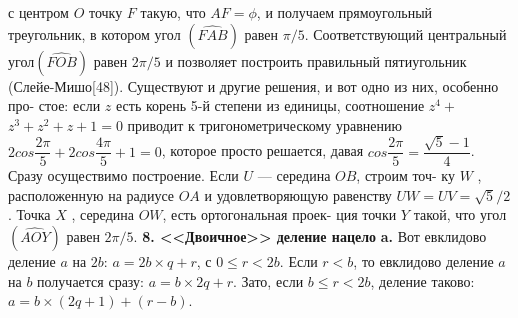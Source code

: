 с центром $O$ точку $F$ такую, что $AF=\phi$, и получаем прямоугольный
треугольник, в котором угол $(\widehat{FAB})$ равен $\pi/5$.\newline
\hspace*{15pt}Соответствующий центральный угол$(\widehat{FOB})$ равен $2\pi/5$ и позволяет\linebreak
построить правильный пятиугольник (Слейе-Мишо[48]).\newline
Существуют и другие решения, и вот одно из них, особенно про-\linebreak
стое: если $z$ есть корень 5-й степени из единицы, соотношение $z^4+$\linebreak
$z^3+z^2+z+1=0$ приводит к тригонометрическому уравнению\linebreak
$2cos\dfrac{2\pi}{5}+2cos\dfrac{4\pi}{5}+1=0$, которое просто решается, давая $cos\dfrac{2\pi}{5}=\dfrac{\sqrt{5}-1}{4}$.\linebreak
Сразу осуществимо построение. Если $U$ — середина $OB$, строим точ-\linebreak
ку $W$ , расположенную на радиусе $OA$ и удовлетворяющую равенству\linebreak
$UW=UV=\sqrt{5}/2$. Точка $X$ , середина $OW$, есть ортогональная проек-\linebreak
ция точки $Y$ такой, что угол $(\widehat{AOY})$ равен $2\pi/5$.
\noindent\textbf{8. <<Двоичное>> деление нацело}
\hspace*{15pt}\textbf{a.} Вот евклидово деление $a$ на $2b$: $a=2b\times q+r$, с $0\leqslant r<2b$. Если\linebreak
$r<b$, то евклидово деление $a$ на $b$ получается сразу: $a=b\times 2q+r$. Зато,\linebreak
если $b\leqslant r<2b$, деление таково: $a=b\times(2q+1)+(r-b)$.
\newpage


